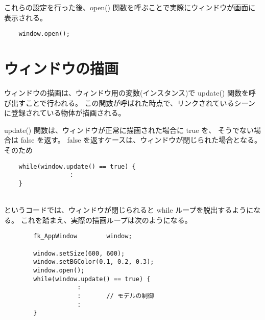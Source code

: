 これらの設定を行った後、open() 関数を呼ぶことで実際にウィンドウが画面に表示される。
\\
\begin{screen}
\begin{verbatim}
    window.open();
\end{verbatim}
\end{screen}
\section{ウィンドウの描画}
ウィンドウの描画は、ウィンドウ用の変数(インスタンス)で update() 関数を呼び出すことで行われる。
この関数が呼ばれた時点で、リンクされているシーンに登録されている物体が描画される。

update() 関数は、ウィンドウが正常に描画された場合に true を、
そうでない場合は false を返す。
false を返すケースは、ウィンドウが閉じられた場合となる。
そのため
\\
\begin{screen}
\begin{verbatim}
    while(window.update() == true) {
                  :
    }
\end{verbatim}
\end{screen}
~ \\
というコードでは、ウィンドウが閉じられると while ループを脱出するようになる。
これを踏まえ、実際の描画ループは次のようになる。
\\
\begin{breakbox}
\begin{verbatim}
        fk_AppWindow        window;

        window.setSize(600, 600);
        window.setBGColor(0.1, 0.2, 0.3);
        window.open();
        while(window.update() == true) {
                    :
                    :       // モデルの制御
                    :
        }       
\end{verbatim}
\end{breakbox}

